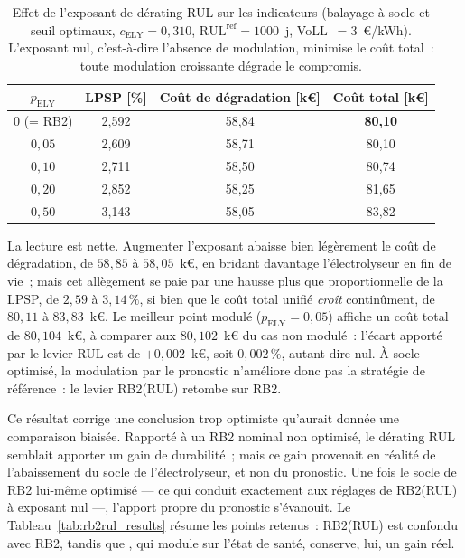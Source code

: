 \begin{table}[h!]
\centering
\caption{Effet de l'exposant de dérating RUL sur les indicateurs (balayage à socle et seuil optimaux, $c_{\text{ELY}} = 0{,}310$, $\mathrm{RUL}^{\text{ref}} = 1000$~j, VoLL~$=3$~€/kWh). L'exposant nul, c'est-à-dire l'absence de modulation, minimise le coût total~: toute modulation croissante dégrade le compromis.}
\label{tab:rb2rul_sweep}
\begin{tabular}{cccc}
\hline
$p_{\text{ELY}}$ & LPSP [\%] & Coût de dégradation [k€] & Coût total [k€] \\
\hline
$0$ (= RB2)     & 2,592 & 58,84 & \textbf{80,10} \\
$0{,}05$        & 2,609 & 58,71 & 80,10 \\
$0{,}10$        & 2,711 & 58,50 & 80,74 \\
$0{,}20$        & 2,852 & 58,25 & 81,65 \\
$0{,}50$        & 3,143 & 58,05 & 83,82 \\
\hline
\end{tabular}
\end{table}

La lecture est nette. Augmenter l'exposant abaisse bien légèrement le coût de dégradation, de $58{,}85$ à $58{,}05$~k€, en bridant davantage l'électrolyseur en fin de vie~; mais cet allègement se paie par une hausse plus que proportionnelle de la LPSP, de $2{,}59$ à $3{,}14\,\%$, si bien que le coût total unifié \emph{croît} continûment, de $80{,}11$ à $83{,}83$~k€. Le meilleur point modulé ($p_{\text{ELY}} = 0{,}05$) affiche un coût total de $80{,}104$~k€, à comparer aux $80{,}102$~k€ du cas non modulé~: l'écart apporté par le levier RUL est de $+0{,}002$~k€, soit $0{,}002\,\%$, autant dire nul. À socle optimisé, la modulation par le pronostic n'améliore donc pas la stratégie de référence~: le levier RB2(RUL) retombe sur RB2.

Ce résultat corrige une conclusion trop optimiste qu'aurait donnée une comparaison biaisée. Rapporté à un RB2 nominal non optimisé, le dérating RUL semblait apporter un gain de durabilité~; mais ce gain provenait en réalité de l'abaissement du socle de l'électrolyseur, et non du pronostic. Une fois le socle de RB2 lui-même optimisé — ce qui conduit exactement aux réglages de RB2(RUL) à exposant nul —, l'apport propre du pronostic s'évanouit. Le Tableau~\ref{tab:rb2rul_results} résume les points retenus~: RB2(RUL) est confondu avec RB2, tandis que \RBsohH, qui module sur l'état de santé, conserve, lui, un gain réel.

